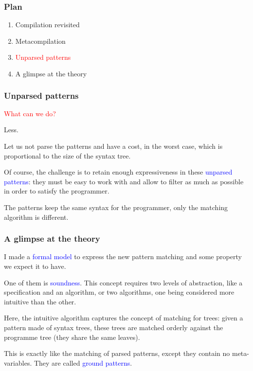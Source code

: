 \documentclass[compress,dvips,xcolor={dvipsnames},t]{beamer}
\begin{document}
% 
\begin{frame}
\frametitle{Plan}


\begin{enumerate}

  \item Compilation revisited

  \item Metacompilation

  \item \textcolor{red}{Unparsed patterns}

  \item A glimpse at the theory

\end{enumerate}

\end{frame}


% 
\begin{frame}
\frametitle{Unparsed patterns}


\textcolor{red}{What can we do?}

Less. 

Let us not parse the patterns and have a cost, in the worst case,
which is proportional to the size of the syntax tree.

Of course, the challenge is to retain enough expressiveness in these
\textcolor{blue}{unparsed patterns}: they must be easy to work with and allow
to filter as much as possible in order to satisfy the programmer.

The patterns keep the same syntax for the programmer, only the
matching algorithm is different.

\end{frame}

% 
\begin{frame}
\frametitle{A glimpse at the theory}


I made a \textcolor{blue}{formal model} to express the new pattern matching and
some property we expect it to have.

One of them is \textcolor{blue}{soundness}. This concept requires two levels of
abstraction, like a specification and an algorithm, or two algorithms,
one being considered more intuitive than the other.

Here, the intuitive algorithm captures the concept of matching for
trees: given a pattern made of syntax trees, these trees are matched
orderly against the programme tree (they share the same leaves).

This is exactly like the matching of parsed patterns, except they
contain no meta\hyp{}variables. They are called \textcolor{blue}{ground
  patterns}.

\end{frame}
\end{document}

